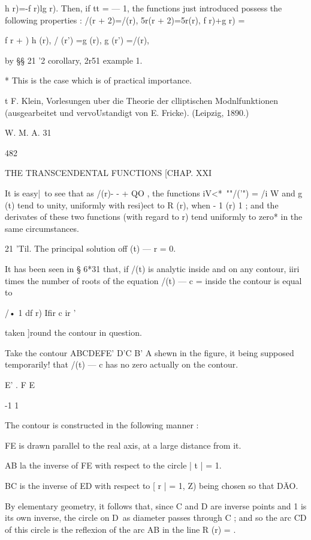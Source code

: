 h r)=-f r)lg r). 
Then, if tt = — 1, the functions just introduced possess the following properties : 
/(r + 2)=/(r), 5r(r + 2)=5r(r), f r)+g r) = \, 

f r +  )  h (r), / (r') =g (r), g (r') =/(r), 

by §§ 21 '2 corollary, 2r51 example 1. 

* This is the case which is of practical importance. 

t F. Klein, Vorlesungen uber die Theorie der clliptischen Modnlfunktionen (ausgearbeitet und 
vervoUstandigt von E. Fricke). (Leipzig, 1890.) 

W. M. A. 31 



482 



THE TRANSCENDENTAL FUNCTIONS [CHAP. XXI 



It is easy|\ to see that as /(r)- - + QO , the functions iV<*~""/('") = /i W and g (t) tend to 
unity, uniformly with resi)ect to R (r), when - 1   (r)   1 ; and the derivates of these two 
functions (with regard to r) tend uniformly to zero* in the same circumstances. 

21 'Til. The principal solution off (t) — r = 0. 

It has been seen in § 6*31 that, if /(t) is analytic inside and on any contour, iiri times 
the number of roots of the equation /(t) — c = inside the contour is equal to 

/• 1 df r) 
Ifir c ir ' 

taken ]round the contour in question. 

Take the contour ABCDEFE' D'C B' A shewn in the figure, it being supposed 
temporarily! that /(t) — c has no zero actually on the contour. 

E' . F E 




-1 1 

The contour is constructed in the following manner : 

FE is drawn parallel to the real axis, at a large distance from it. 

AB la the inverse of FE with respect to the circle | t | = 1. 

BC is the inverse of ED with respect to [ r | = 1, Z) being chosen so that D\=AO. 

By elementary geometry, it follows that, since C and D are inverse points and 1 is its 
own inverse, the circle on D\ as diameter passes through C ; and so the arc CD of this 
circle is the reflexion of the arc AB in the line R (r) =  . 

